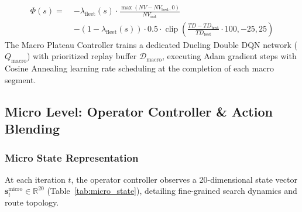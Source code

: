 \documentclass{ieeeaccess}
\begin{document}
\begin{align}
  \Phi(s) = \; &-\lambda_{\text{fleet}}(s) \cdot \frac{\max(NV - NV_{\text{best}}, 0)}{NV_{\text{init}}} \nonumber \\
  &- (1 - \lambda_{\text{fleet}}(s)) \cdot 0.5 \cdot \operatorname{clip}\left(\frac{TD - TD_{\text{best}}}{TD_{\text{best}}} \cdot 100, -25, 25\right)
  \label{eq:potential_function}
\end{align}
The Macro Plateau Controller trains a dedicated Dueling Double DQN network ($Q_{\text{macro}}$) with prioritized replay buffer $\mathcal{D}_{\text{macro}}$, executing Adam gradient steps with Cosine Annealing learning rate scheduling at the completion of each macro segment.

\subsection{Micro Level: Operator Controller \& Action Blending}
\label{sec:micro_controller}

\subsubsection{Micro State Representation}
At each iteration $t$, the operator controller observes a 20-dimensional state vector $\mathbf{s}_t^{\text{micro}} \in \mathbb{R}^{20}$ (Table~\ref{tab:micro_state}), detailing fine-grained search dynamics and route topology.
\end{document}
